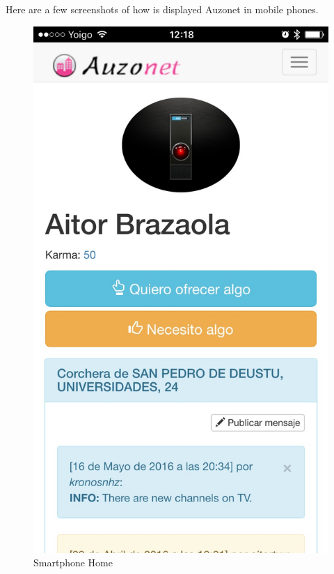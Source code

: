 \documentclass{DeustoFDP}
\begin{document}
Here are a few screenshots of how is displayed Auzonet in mobile phones.
\begin{figure}[h!]
\centering
\includegraphics[width=0.7\linewidth]{fig/Manual/mobilehome}
\caption[Smartphone Home]{Smartphone Home}
\label{fig:mobilehome}
\end{figure}
\end{document}
